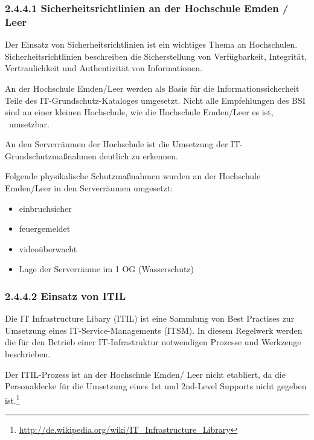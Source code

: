 \documentclass[a4paper]{article}
\newcommand\textstyleAbsatzStandardschriftart[1]{#1}
\newcommand\liststyleLiv{%
\renewcommand\labelitemi{{\textbullet}}
\renewcommand\labelitemii{o}
\renewcommand\labelitemiii{${\blacksquare}$}
\renewcommand\labelitemiv{{\textbullet}}
}
\begin{document}
\subsubsection{2.4.4.1 Sicherheitsrichtlinien an der Hochschule Emden / Leer}
{\sffamily\mdseries\color{black}
Der Einsatz von Sicherheitsrichtlinien ist ein wichtiges Thema an Hochschulen. Sicherheitsrichtlinien beschreiben die
Sicherstellung von Verfügbarkeit, Integrität, Vertraulichkeit und Authentizität von Informationen.}

{\sffamily\mdseries\color{black}
\textstyleAbsatzStandardschriftart{An der Hochschule Emden/Leer werden als Basis für die Informationssicherheit Teile
des IT-Grundschutz-Kataloges umgesetzt. Nicht alle Empfehlungen des BSI sind an einer kleinen Hochschule, wie die
Hochschule Emden/Leer es ist, \ umsetzbar.}}

{\sffamily\mdseries\color{black}
An den Serverräumen der Hochschule ist die Umsetzung der IT-Grundschutzmaßnahmen deutlich zu erkennen.}

{\sffamily\mdseries\color{black}
Folgende physikalische Schutzmaßnahmen wurden an der Hochschule Emden/Leer in den Serverräumen umgesetzt:}


\bigskip

\liststyleLiv
\begin{itemize}
\item {\sffamily\color{black}
einbruchsicher}
\item {\sffamily\color{black}
feuergemeldet}
\item {\sffamily\color{black}
videoüberwacht}
\item {\sffamily\color{black}
Lage der Serverräume im 1 OG (Wasserschutz)}
\end{itemize}
\subsubsection[2.4.4.2 Einsatz von ITIL]{\textstyleAbsatzStandardschriftart{2.4.4.2 Einsatz von ITIL}}
{\sffamily\mdseries\color{black}
Die IT Infrastructure Libary (ITIL) ist eine Sammlung von Best Practises zur Umsetzung eines IT-Service-Managements
(ITSM). In diesem Regelwerk werden die für den Betrieb einer IT-Infrastruktur notwendigen Prozesse und Werkzeuge
beschrieben.}

{\sffamily\color{black}
\textstyleAbsatzStandardschriftart{Der ITIL-Prozess ist an der Hochschule Emden/ Leer nicht etabliert, da die
Personaldecke für die Umsetzung eines 1st und 2nd-Level Supports nicht gegeben
ist.}\footnote{\url{http://de.wikipedia.org/wiki/IT_Infrastructure_Library}}}
\end{document}
